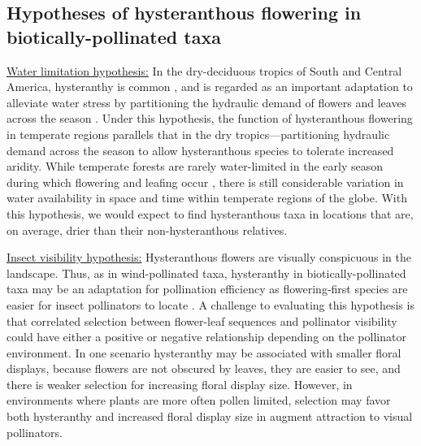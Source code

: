 \documentclass{article}[12pt]
\begin{document}
\subsection*{Hypotheses of hysteranthous flowering in biotically-pollinated taxa}

\underline{Water limitation hypothesis:} In the dry-deciduous tropics of South and Central America, hysteranthy is common \citep{Rathcke_1985,Franklin2016}, and is regarded as an important adaptation to alleviate water stress by partitioning the hydraulic demand of flowers and leaves across the season \citep{Gougherty2018,Franklin2016,Borchert1983,Reich1984}. Under this hypothesis, the function of hysteranthous flowering in temperate regions parallels that in the dry tropics---partitioning hydraulic demand across the season to allow hysteranthous species to tolerate increased aridity. While temperate forests are rarely water-limited in the early season during which flowering and leafing occur \citep{Polgar2011}, there is still considerable variation in water availability in space and time within temperate regions of the globe.  With this hypothesis, we would expect to find hysteranthous taxa in locations that are, on average, drier than their non-hysteranthous relatives.

\underline{Insect visibility hypothesis:} Hysteranthous flowers are visually conspicuous in the landscape. Thus, as in wind-pollinated taxa, hysteranthy in biotically-pollinated taxa may be an adaptation for pollination efficiency as flowering-first species are easier for insect pollinators to locate \citep{Janzen1967}. A challenge to evaluating this hypothesis is that correlated selection between flower-leaf sequences and pollinator visibility could have either a positive or negative relationship depending on the pollinator environment. In one scenario hysteranthy may be associated with smaller floral displays, because flowers are not obscured by leaves, they are easier to see, and there is weaker selection for increasing floral display size. However, in environments where plants are more often pollen limited, selection may favor both hysteranthy and increased floral display size in augment attraction to visual pollinators.

\end{document}

